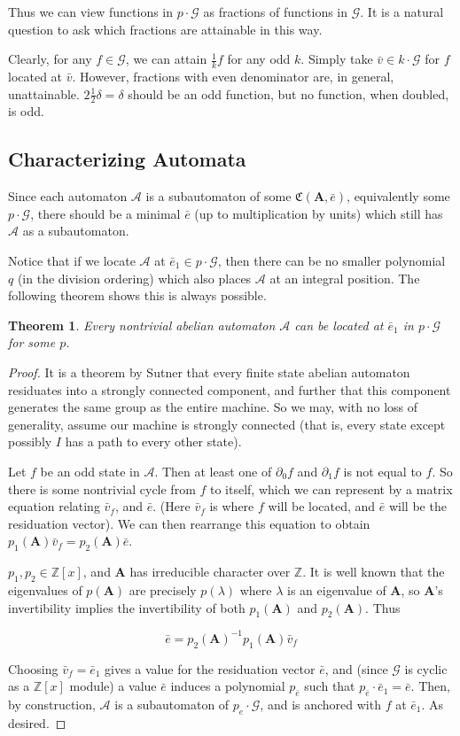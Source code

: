 \documentclass{article}
\newcommand{\A}{\mathcal{A}}
\newcommand{\G}{\mathcal{G}}
\newcommand{\C}{\mathfrak{C}(\Am,\e)}
\newcommand{\Z}{\mathbb{Z}}
\newcommand{\2}{\textbf{2}}
\newcommand{\Am}{\textbf{A}}
\newcommand{\del}{\partial}
\newcommand{\vv}{\bar{v}}
\newcommand{\e}{\bar{e}}
\newtheorem{thm}{Theorem}
\theoremstyle{definition}
\begin{document}
Thus we can view functions in $p \cdot \G$ as fractions of functions in $\G$.
It is a natural question to ask which fractions are attainable in this way.

Clearly, for any $f \in \G$, we can attain $\frac{1}{k} f$ for any odd $k$.
Simply take $\vv \in k \cdot \G$ for $f$ located at $\vv$.
However, fractions with even denominator are, in general, unattainable.
$2 \frac{1}{2}\delta = \delta$ should be an odd function,
but no function, when doubled, is odd.

\subsection{Characterizing Automata}
Since each automaton $\A$ is a subautomaton of some $\C$,
equivalently some $p \cdot \G$, there should be a minimal $\e$ 
(up to multiplication by units) which still has $\A$ as a subautomaton. 

Notice that if we locate $\A$ at $\e_1 \in p \cdot \G$, 
then there can be no smaller polynomial $q$ (in the division ordering)
which also places $\A$ at an integral position. The following theorem 
shows this is always possible.

\begin{thm}
  Every nontrivial abelian automaton $\A$ can be 
  located at $\e_1$ in $p \cdot \G$ for some $p$.
\end{thm}

\begin{proof}
  It is a theorem by Sutner \cite{Sutner18:abelian_automata} that every 
  finite state abelian automaton residuates into a strongly connected component, 
  and further that this component generates the same group as the entire 
  machine. So we may, with no loss of generality, assume our machine is 
  strongly connected (that is, every state except possibly $I$ has a path to
  every other state).

  Let $f$ be an odd state in $\A$. Then at least one of $\del_0 f$ and 
  $\del_1 f$ is not equal to $f$. So there is some nontrivial cycle
  from $f$ to itself, which we can represent by a matrix equation 
  relating $\vv_f$, and $\e$. (Here $\vv_f$ is where $f$ will be located, 
  and $\e$ will be the residuation vector). 
  We can then rearrange this equation to obtain 
  $p_1(\Am)\vv_f = p_2(\Am)\e$.

  $p_1, p_2 \in \Z[x]$, and $\Am$ has irreducible character over $\Z$.
  It is well known that the eigenvalues of $p(\Am)$ are precisely $p(\lambda)$
  where $\lambda$ is an eigenvalue of $\Am$, so $\Am$'s invertibility implies
  the invertibility of both $p_1(\Am)$ and $p_2(\Am)$. Thus

  \[ \e = p_2(\Am)^{-1}p_1(\Am)\vv_f \]

  Choosing $\vv_f = \e_1$ gives a value for the residuation vector $\e$,
  and (since $\G$ is cyclic as a $\Z[x]$ module) a value $\e$ induces a 
  polynomial $p_{\e}$ such that $p_{\e} \cdot \e_1 = \e$. 
  Then, by construction, $\A$ is a subautomaton of $p_e \cdot \G$, and is 
  anchored with $f$ at $\e_1$. As desired.
\end{proof}
\end{document}
